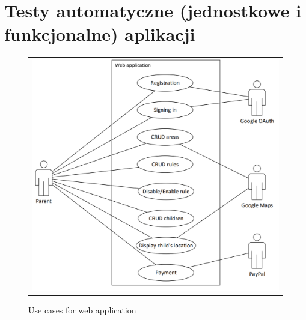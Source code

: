 \documentclass{sprawozdanie-agh}
\begin{document}
	\section{Testy automatyczne (jednostkowe i funkcjonalne) aplikacji}

	\begin{figure}[H]
    		\centering
    		\begin{tabular}{c}
    			\includegraphics[width=.80\textwidth]{webUseCase}
    		\end{tabular}
    		\caption{Use cases for web application}
    	\end{figure}
\end{document}
